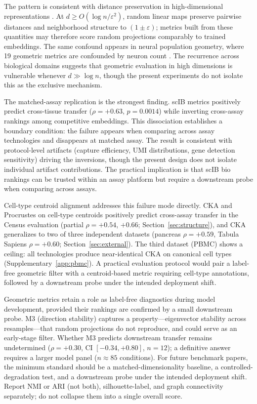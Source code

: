 \documentclass[11pt]{article}
\begin{document}
The pattern is consistent with distance preservation in high-dimensional representations \citep{johnsonlindenstrauss1984}. At $d \geq O(\log n / \varepsilon^2)$, random linear maps preserve pairwise distances and neighborhood structure to $(1 \pm \varepsilon)$; metrics built from these quantities may therefore score random projections comparably to trained embeddings. The same confound appears in neural population geometry, where 19 geometric metrics are confounded by neuron count \citep{tower2026bracket}. The recurrence across biological domains suggests that geometric evaluation in high dimensions is vulnerable whenever $d \gg \log n$, though the present experiments do not isolate this as the exclusive mechanism.

The matched-assay replication is the strongest finding. scIB metrics positively predict cross-tissue transfer ($\rho = +0.63$, $p = 0.0014$) while inverting cross-assay rankings among competitive embeddings. This dissociation establishes a boundary condition: the failure appears when comparing across assay technologies and disappears at matched assay. The result is consistent with protocol-level artifacts (capture efficiency, UMI distributions, gene detection sensitivity) driving the inversions, though the present design does not isolate individual artifact contributions. The practical implication is that scIB bio rankings can be trusted within an assay platform but require a downstream probe when comparing across assays.

Cell-type centroid alignment addresses this failure mode directly. CKA and Procrustes on cell-type centroids positively predict cross-assay transfer in the Census evaluation (partial $\rho = +0.54$, $+0.66$; Section~\ref{sec:structure}), and CKA generalizes to two of three independent datasets (pancreas $\rho = +0.59$, Tabula Sapiens $\rho = +0.60$; Section~\ref{sec:external}). The third dataset (PBMC) shows a ceiling: all technologies produce near-identical CKA on canonical cell types (Supplementary~\ref{app:pbmc}). A practical evaluation protocol would pair a label-free geometric filter with a centroid-based metric requiring cell-type annotations, followed by a downstream probe under the intended deployment shift.

Geometric metrics retain a role as label-free diagnostics during model development, provided their rankings are confirmed by a small downstream probe. M3 (direction stability) captures a property---eigenvector stability across resamples---that random projections do not reproduce, and could serve as an early-stage filter. Whether M3 predicts downstream transfer remains undetermined ($\rho = +0.30$, CI $[-0.34, +0.80]$, $n = 12$); a definitive answer requires a larger model panel ($n \approx 85$ conditions). For future benchmark papers, the minimum standard should be a matched-dimensionality baseline, a controlled-degradation test, and a downstream probe under the intended deployment shift. Report NMI or ARI (not both), silhouette-label, and graph connectivity separately; do not collapse them into a single overall score.
\end{document}
